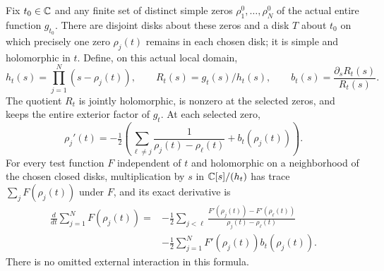 \documentclass[11pt]{article}
\begin{document}
\begin{hdttheorem}\label{hdt:thm:moving}
Fix $t_0\in\mathbb C$ and any finite set of distinct simple zeros
$\rho_1^0,\ldots,\rho_N^0$ of the actual entire function $g_{t_0}$.
There are disjoint disks about these zeros and a disk $T$ about
$t_0$ on which precisely one zero $\rho_j(t)$ remains in each
chosen disk; it is simple and holomorphic in $t$.
Define, on this actual local domain,
\begin{equation}\label{hdt:eq:moving-factor}
h_t(s)=\prod_{j=1}^N(s-\rho_j(t)),\qquad
R_t(s)=g_t(s)/h_t(s),\qquad b_t(s)=\frac{\partial_sR_t(s)}{R_t(s)}.
\end{equation}
The quotient $R_t$ is jointly holomorphic, is nonzero at the
selected zeros, and keeps the entire exterior factor of $g_t$.
At each selected zero,
\begin{equation}\label{hdt:eq:velocity}
\rho_j'(t)=-\tfrac12\left(
\sum_{\ell\ne j}\frac1{\rho_j(t)-\rho_\ell(t)}
+b_t(\rho_j(t))\right).
\end{equation}
For every test function $F$ independent of $t$ and holomorphic on
a neighborhood of the chosen closed disks, multiplication
by $s$ in $\mathbb C[s]/(h_t)$ has trace $\sum_jF(\rho_j(t))$ under $F$,
and its exact derivative is
\begin{equation}\label{hdt:eq:moving-trace}
\begin{split}
\frac d{dt}\sum_{j=1}^NF(\rho_j(t))
={}&-\frac12\sum_{j<\ell}
\frac{F'(\rho_j(t))-F'(\rho_\ell(t))}
{\rho_j(t)-\rho_\ell(t)}\\
&-\frac12\sum_{j=1}^NF'(\rho_j(t))b_t(\rho_j(t)).
\end{split}
\end{equation}
There is no omitted external interaction in this formula.
\end{hdttheorem}
\end{document}
